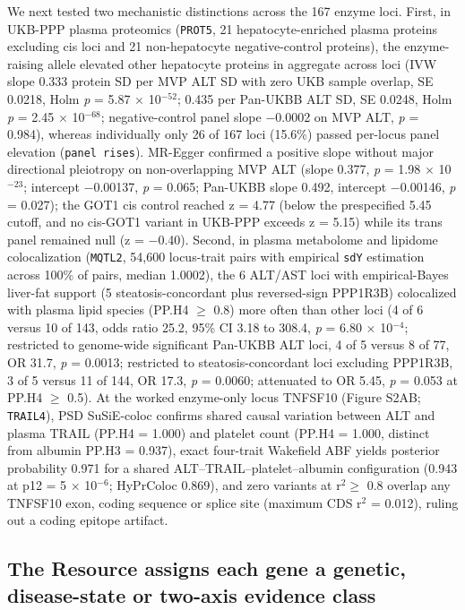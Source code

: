 We next tested two mechanistic distinctions across the 167 enzyme loci. First, in UKB-PPP plasma proteomics (\texttt{PROT5}, 21 hepatocyte-enriched plasma proteins excluding cis loci and 21 non-hepatocyte negative-control proteins), the enzyme-raising allele elevated other hepatocyte proteins in aggregate across loci (IVW slope 0.333 protein SD per MVP ALT SD with zero UKB sample overlap, SE 0.0218, Holm \emph{p} = 5.87 $\times$ 10$^{-52}$; 0.435 per Pan-UKBB ALT SD, SE 0.0248, Holm \emph{p} = 2.45 $\times$ 10$^{-68}$; negative-control panel slope $-$0.0002 on MVP ALT, \emph{p} = 0.984), whereas individually only 26 of 167 loci (15.6\%) passed per-locus panel elevation (\texttt{panel rises}). MR-Egger confirmed a positive slope without major directional pleiotropy on non-overlapping MVP ALT (slope 0.377, \emph{p} = 1.98 $\times$ 10$^{-23}$; intercept $-$0.00137, \emph{p} = 0.065; Pan-UKBB slope 0.492, intercept $-$0.00146, \emph{p} = 0.027); the GOT1 cis control reached z = 4.77 (below the prespecified 5.45 cutoff, and no cis-GOT1 variant in UKB-PPP exceeds \textbar z\textbar{} = 5.15) while its trans panel remained null (z = $-$0.40). Second, in plasma metabolome and lipidome colocalization (\texttt{MQTL2}, 54,600 locus-trait pairs with empirical \texttt{sdY} estimation across 100\% of pairs, median 1.0002), the 6 ALT/AST loci with empirical-Bayes liver-fat support (5 steatosis-concordant plus reversed-sign PPP1R3B) colocalized with plasma lipid species (PP.H4 $\ge$ 0.8) more often than other loci (4 of 6 versus 10 of 143, odds ratio 25.2, 95\% CI 3.18 to 308.4, \emph{p} = 6.80 $\times$ 10$^{-4}$; restricted to genome-wide significant Pan-UKBB ALT loci, 4 of 5 versus 8 of 77, OR 31.7, \emph{p} = 0.0013; restricted to steatosis-concordant loci excluding PPP1R3B, 3 of 5 versus 11 of 144, OR 17.3, \emph{p} = 0.0060; attenuated to OR 5.45, \emph{p} = 0.053 at PP.H4 $\ge$ 0.5). At the worked enzyme-only locus TNFSF10 (Figure S2AB; \texttt{TRAIL4}), PSD SuSiE-coloc confirms shared causal variation between ALT and plasma TRAIL (PP.H4 = 1.000) and platelet count (PP.H4 = 1.000, distinct from albumin PP.H3 = 0.937), exact four-trait Wakefield ABF yields posterior probability 0.971 for a shared ALT--TRAIL--platelet--albumin configuration (0.943 at p12 = 5 $\times$ 10$^{-6}$; HyPrColoc 0.869), and zero variants at r$^2 \ge$ 0.8 overlap any TNFSF10 exon, coding sequence or splice site (maximum CDS r$^2$ = 0.012), ruling out a coding epitope artifact.

\subsection{The Resource assigns each gene a genetic, disease-state or two-axis evidence class}\label{the-resource-assigns-each-gene-a-genetic-disease-state-or-two-axis-evidence-class}

